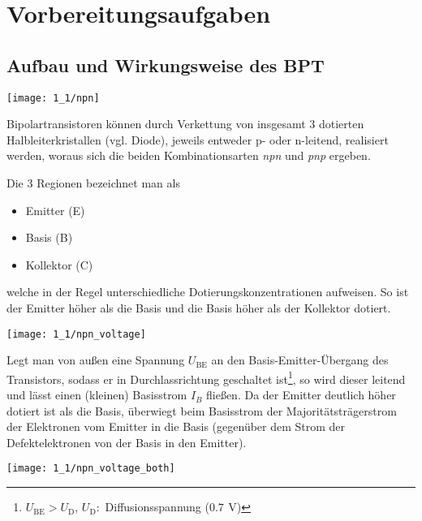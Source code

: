 \documentclass[a4paper, 12pt]{article}
\begin{document}
  
  \clearpage
  \setcounter{page}{1}

\section{Vorbereitungsaufgaben}

\subsection{Aufbau und Wirkungsweise des BPT}

\begin{center}
  \texttt{[image: 1\_1/npn]}
\end{center}

Bipolartransistoren können durch Verkettung von insgesamt 3
dotierten Halbleiterkristallen (vgl. Diode), jeweils entweder p- oder
n-leitend, realisiert werden, woraus sich die beiden Kombinationsarten
\textit{npn} und \textit{pnp} ergeben.

\noindent Die 3 Regionen bezeichnet man als
\begin{itemize}
\item Emitter (E)
\item Basis (B)
\item Kollektor (C)
\end{itemize}

welche in der
Regel unterschiedliche Dotierungskonzentrationen aufweisen. So ist der Emitter
höher als die Basis und die Basis höher als der Kollektor dotiert.


\begin{center}
  \texttt{[image: 1\_1/npn\_voltage]}
\end{center}

Legt man von außen eine Spannung $U_\textrm{BE}$ an den Basis-Emitter-Übergang
des Transistors, sodass er in Durchlassrichtung geschaltet
ist\footnote{$U_{\textrm{BE}}>U_\textrm{D}$, $U_\textrm{D}:$ Diffusionsspannung
  ($0.7 \,\ \si{\volt}$)}, so wird dieser leitend und lässt einen (kleinen) Basisstrom
$I_B$ fließen. Da der Emitter deutlich höher dotiert ist als die Basis,
überwiegt beim Basisstrom der Majoritätsträgerstrom der Elektronen vom Emitter in
die Basis (gegenüber
dem Strom der Defektelektronen von der Basis in den Emitter).

\begin{center}
  \texttt{[image: 1\_1/npn\_voltage\_both]}
\end{center}
\end{document}
